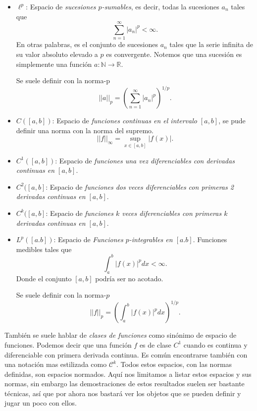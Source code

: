 \documentclass[12pt]{book}
\begin{document}
\begin{itemize}
    \item $\ell^p$: Espacio de \textit{sucesiones $p$-sumables}, es decir, todas la sucesiones $a_n$ tales que
    \[
        \sum_{n=1}^\infty |a_n|^p<\infty. 
    \]
    En otras palabras, es el conjunto de sucesiones $a_n$ tales que la serie infinita de su valor absoluto elevado a $p$ es convergente. Notemos que una sucesión es simplemente una función $a:\mathbb N \to \mathbb R$.

    Se suele definir con la norma-p
    \[
        ||a||_p=\left(\sum_{n=1}^{\infty}|a_n|^p\right)^{1/p}.
    \]

    \item $C([a,b])$: Espacio de \textit{funciones continuas en el intervalo $[a,b]$}, se pude definir una norma con la norma del supremo.
    \[
        ||f||_\infty = \sup_{x\in[a,b]}|f(x)|.
    \]
    
    \item $C^1([a,b])$: Espacio de \textit{funciones una vez diferenciables con derivadas continuas en $[a,b]$}.

    \item $C^2([a,b]$: Espacio de \textit{funciones dos veces diferenciables con primeras 2 derivadas continuas en $[a,b]$}.

    \item $C ^k([a,b]$: Espacio de \textit{funciones $k$ veces diferenciables con primeras $k$ derivadas continuas en $[a,b]$}.

    \item $L^p([a.b])$: Espacio de \textit{Funciones $p$-integrables en $[a.b]$}. Funciones medibles tales que
    \[
        \int_a^b |f(x)|^pdx <\infty.
    \]
    Donde el conjunto $[a,b]$ podría ser no acotado.

    Se suele definir con la norma-$p$
    \[
        ||f||_p=\left(\int_a^b |f(x)|^pdx\right)^{1/p}.
    \]
\end{itemize}

También se suele hablar de \textit{clases de funciones} como sinónimo de espacio de funciones. Podemos decir que una función $f$ es de clase $C^1$ cuando es continua y diferenciable con primera derivada continua. Es común encontrarse también con una notación mas estilizada como $\mathscr{C}^k$. Todos estos espacios, con las normas definidas, son espacios normados. Aquí nos limitamos a listar estos espacios y sus normas, sin embargo las demostraciones de estos resultados suelen ser bastante técnicas, así que por ahora nos bastará ver los objetos que se pueden definir y jugar un poco con ellos. 
\end{document}
